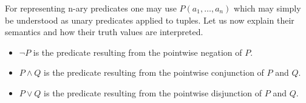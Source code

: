 \documentclass[runningheads]{llncs}
\newcommand{\SP}{\;\;\;}
\newcommand{\TAnd}{\textit{And}}
\newcommand{\TNot}{\textit{Not}}
\newcommand{\TTV}{\textit{TV}}
\newcommand{\TBTV}{\langle \TTV \rangle}
\newcommand{\prob}{\mathcal{Pr}}
\begin{document}
For representing n-ary predicates one may use $P(a_1, \dots, a_n)$
which may simply be understood as unary predicates applied to tuples.
Let us now explain their semantics and how their truth values are
interpreted.
\begin{itemize}
\item $\lnot P$ is the predicate resulting from the pointwise negation
  of $P$.
\item
  $P \land Q$ is the predicate resulting from the pointwise
  conjunction of $P$ and $Q$.
\item
  $P \lor Q$ is the predicate resulting from the pointwise disjunction
  of $P$ and $Q$.

\end{itemize}
\end{document}

